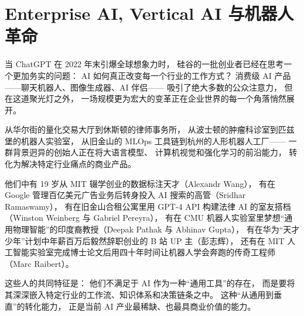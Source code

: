 \chapter{Enterprise AI, Vertical AI 与机器人革命}
\label{ch:enterprise}


当 ChatGPT 在 2022 年末引爆全球想象力时，
硅谷的一批创业者已经在思考一个更加务实的问题：
AI 如何真正改变每一个行业的工作方式？
消费级 AI 产品——聊天机器人、图像生成器、AI 伴侣——
吸引了绝大多数的公众注意力，
但在这道聚光灯之外，
一场规模更为宏大的变革正在企业世界的每一个角落悄然展开。

从华尔街的量化交易大厅到休斯顿的律师事务所，
从波士顿的肿瘤科诊室到匹兹堡的机器人实验室，
从旧金山的 MLOps 工具链到杭州的人形机器人工厂——
一群背景迥异的创始人正在将大语言模型、
计算机视觉和强化学习的前沿能力，
转化为解决特定行业痛点的商业产品。

他们中有 19 岁从 MIT 辍学创业的数据标注天才（Alexandr Wang），
有在 Google 管理百亿美元广告业务后转身投入 AI 搜索的高管（Sridhar Ramaswamy），
有在旧金山合租公寓里用 GPT-4 API 构建法律 AI 的室友搭档（Winston Weinberg 与 Gabriel Pereyra），
有在 CMU 机器人实验室里梦想``通用物理智能''的印度裔教授（Deepak Pathak 与 Abhinav Gupta），
有在华为``天才少年''计划中年薪百万后毅然辞职创业的 B 站 UP 主（彭志辉），
还有在 MIT 人工智能实验室完成博士论文后用四十年时间让机器人学会奔跑的传奇工程师（Marc Raibert）。

这些人的共同特征是：
他们不满足于 AI 作为一种``通用工具''的存在，
而是要将其深深嵌入特定行业的工作流、知识体系和决策链条之中。
这种``从通用到垂直''的转化能力，
正是当前 AI 产业最稀缺、也最具商业价值的能力。

